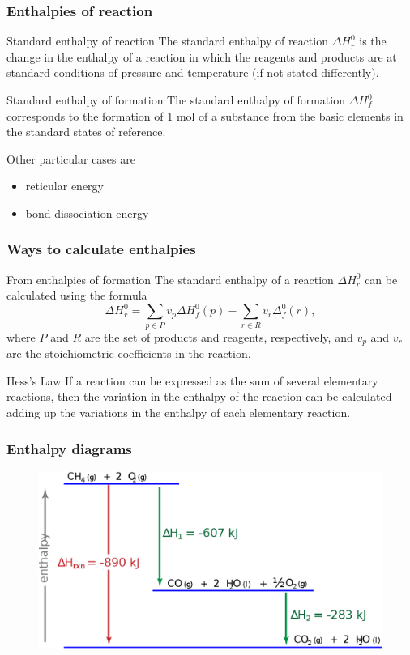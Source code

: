 \documentclass{beamer}
\begin{document}
\begin{frame}
\frametitle{Enthalpies of reaction}
\begin{block}{Standard enthalpy of reaction}
The standard enthalpy of reaction $\Delta H_r^0$ is the change in the enthalpy of a reaction in which the reagents and products are at standard conditions of pressure and temperature (if not stated differently).
\end{block}
\begin{block}{Standard enthalpy of formation}
The standard enthalpy of formation $\Delta H_f^0$ corresponds to the formation of 1 mol of a substance from the basic elements in the standard states of reference.
\end{block}
Other particular cases are
\begin{itemize}
\item reticular energy
\item bond dissociation energy
\end{itemize}
\end{frame}


\begin{frame}
\frametitle{Ways to calculate enthalpies}
\begin{block}{From enthalpies of formation}
The standard enthalpy of a reaction $\Delta H_r^0$ can be calculated using the formula
\begin{equation*}
\Delta H_r^0=\sum_{p\in P}v_p\Delta H_f^0(p) - \sum_{r\in R} v_r\Delta_f^0(r),
\end{equation*}
where $P$ and $R$ are the set of products and reagents, respectively, and $v_p$ and $v_r$ are the stoichiometric coefficients in the reaction.
\end{block}
\begin{block}{Hess's Law}
If a reaction can be expressed as the sum of several elementary reactions, then the variation in the enthalpy of the reaction can be calculated adding up the variations in the enthalpy of each elementary reaction.
\end{block}
\end{frame}


\begin{frame}
\frametitle{Enthalpy diagrams}
\begin{figure}
\includegraphics[width=0.9\linewidth]{hess-law}
\end{figure}
\end{frame}
\end{document}

